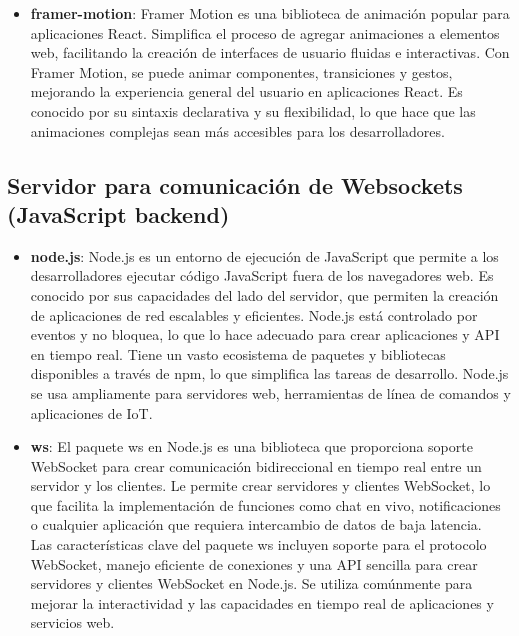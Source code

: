 \documentclass[osajnl,twocolumn,showpacs,superscriptaddress,10pt]{revtex4-1}
\begin{document}
\begin{itemize}
  \item \textbf{framer-motion}:
  Framer Motion es una biblioteca de animación popular para aplicaciones React. Simplifica el proceso de agregar animaciones a elementos web, facilitando la creación de interfaces de usuario fluidas e interactivas. Con Framer Motion, se puede animar componentes, transiciones y gestos, mejorando la experiencia general del usuario en aplicaciones React. Es conocido por su sintaxis declarativa y su flexibilidad, lo que hace que las animaciones complejas sean más accesibles para los desarrolladores.
\end{itemize}

\subsection*{Servidor para comunicación de Websockets (JavaScript backend)}
\begin{itemize}
    \item \textbf{node.js}: 
    Node.js es un entorno de ejecución de JavaScript que permite a los desarrolladores ejecutar código JavaScript fuera de los navegadores web. Es conocido por sus capacidades del lado del servidor, que permiten la creación de aplicaciones de red escalables y eficientes. Node.js está controlado por eventos y no bloquea, lo que lo hace adecuado para crear aplicaciones y API en tiempo real. Tiene un vasto ecosistema de paquetes y bibliotecas disponibles a través de npm, lo que simplifica las tareas de desarrollo. Node.js se usa ampliamente para servidores web, herramientas de línea de comandos y aplicaciones de IoT.
    \item \textbf{ws}:
    El paquete ws en Node.js es una biblioteca que proporciona soporte WebSocket para crear comunicación bidireccional en tiempo real entre un servidor y los clientes. Le permite crear servidores y clientes WebSocket, lo que facilita la implementación de funciones como chat en vivo, notificaciones o cualquier aplicación que requiera intercambio de datos de baja latencia.
    \\
    Las características clave del paquete ws incluyen soporte para el protocolo WebSocket, manejo eficiente de conexiones y una API sencilla para crear servidores y clientes WebSocket en Node.js. Se utiliza comúnmente para mejorar la interactividad y las capacidades en tiempo real de aplicaciones y servicios web.

\end{itemize}
\end{document}

